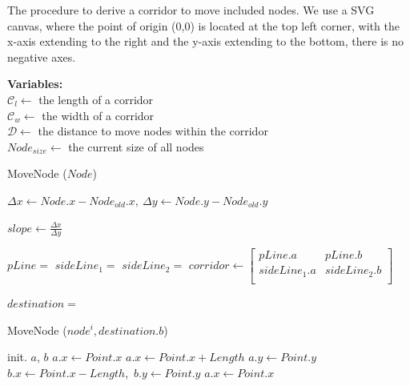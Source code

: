 \begin{algorithm}[tb!]
    \caption{The procedure to derive a corridor to move included nodes. We use a SVG canvas, where the point of origin (0,0) is located at the top left corner, with the x-axis extending to the right and the y-axis extending to the bottom, there is no negative axes.}\label{alg:derive corridor}
    \textbf{Variables:} \\
    $\mathcal{C}_l \gets$ the length of a corridor \\
    $\mathcal{C}_w \gets$ the width of a corridor \\
    $\mathcal{D} \gets$ the distance to move nodes within the corridor \\
    $Node_{size}\gets$ the current size of all nodes \\
    \begin{algorithmic}[1]
        \State MoveNode ($ Node $)

        \State $ \Delta x \gets Node.x - Node_{old}.x,~ \Delta y \gets Node.y - Node_{old}.y $

        \State $ slope \gets \frac{\Delta x}{\Delta y}$

        \State $ pLine = $ 
        \State $ sideLine_1 = $ 
        \State $ sideLine_2 = $ 
        \State $ corridor \gets
            \begin{bmatrix}
                pLine.a &
                pLine.b \\

                sideLine_1.a &
                sideLine_2.b \\
            \end{bmatrix} $

            \State $ destination = $ 

            \State MoveNode ($ node^i, destination.b $)
        \EndFor

        \EndProcedure

        \item[]

        
        \State init. $ a $, $ b $
                    \State $ a.x \gets Point.x $
                \Else
                    \State $ a.x \gets Point.x + Length $
                \EndIf
                \State $ a.y \gets Point.y $
                \State $ b.x \gets Point.x - Length $,~$ b.y \gets Point.y $
            \EndCase
                \State $ a.x \gets Point.x $


\end{algorithmic}
\end{algorithm}
